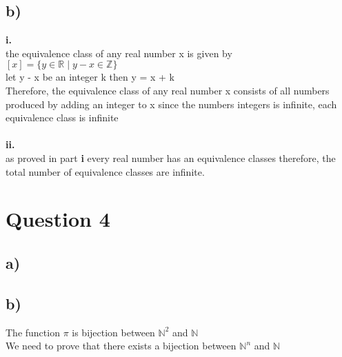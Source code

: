 \documentclass[11pt]{article}
\begin{document}
\subsection*{b)}
\textbf{i.} \\
the equivalence class of any real number x is given by \\
$[x] = \{y \in \mathbb{R} \;|\; y - x \in \mathbb{Z}\}$ \\
let y - x be an integer k then y = x + k \\
Therefore, the equivalence class of any real number x consists of all numbers
produced by adding an integer to x
since the numbers integers is infinite, each equivalence class is infinite
\\ \\
\textbf{ii.} \\
as proved in part \textbf{i} every real number has an equivalence classes therefore,
the total number of equivalence classes are infinite.

\section*{Question 4}
\subsection*{a)}

\subsection*{b)}
The function $\pi$ is bijection between $\mathbb{N}^2$ and $\mathbb{N}$ \\
We need to prove that there exists a bijection between $\mathbb{N}^n$ and $\mathbb{N}$ \\
\end{document}

